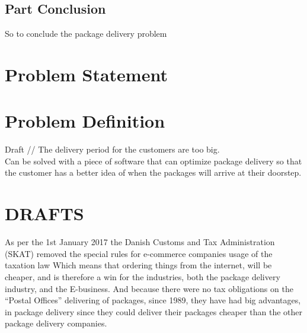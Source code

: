 \documentclass[12pt]{report}
\begin{document}
\section{Part Conclusion}
So to conclude the package delivery problem 

\chapter{Problem Statement}


\chapter{Problem Definition}

Draft // The delivery period for the customers are too big. \\
Can be solved with a piece of software that can optimize package delivery so that the customer has a better idea of when the packages will arrive at their doorstep.

\chapter{DRAFTS}
As per the 1st January 2017 the Danish Customs and Tax Administration (SKAT) removed the special rules for e-commerce companies usage of the taxation law 
Which means that ordering things from the internet, will be cheaper, and is therefore a win for the industries, both the package delivery industry, and the E-business. And because there were no tax obligations on the “Postal Offices” delivering of packages, since 1989, they have had big advantages, in package delivery since they could deliver their packages cheaper than the other package delivery companies\cite{ikkemeremoms}.


\end{document}
